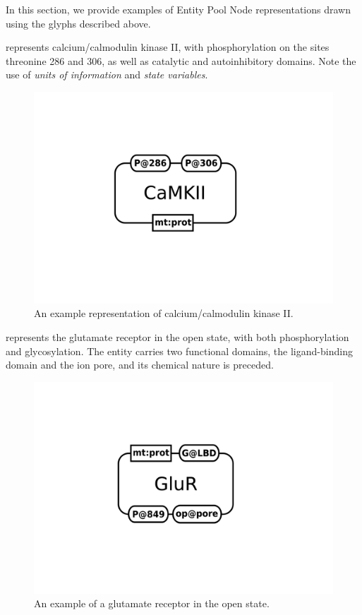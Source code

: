 In this section, we provide examples of Entity Pool Node representations drawn using the \SBGNPDLone glyphs described above.

 represents calcium/calmodulin kinase II, with phosphorylation on the sites threonine 286 and 306, as well as catalytic and autoinhibitory domains.  Note the use of \emph{units of information} and \emph{state variables}.

\begin{figure}[htb]
  \centering
  \includegraphics[scale = 0.3]{examples/macromolecule-CaMKII}
  \caption{An example representation of calcium/calmodulin kinase II.}
  \label{fig:techref:example-camkii}
\end{figure}

 represents the glutamate receptor in the open state, with both phosphorylation and glycosylation. The entity carries two functional domains, the ligand-binding domain and the ion pore, and its chemical nature is preceded.

\begin{figure}[htb]
  \centering
  \includegraphics[scale = 0.3]{examples/macromolecule-GluR}
  \caption{An example of a glutamate receptor in the open state.}
  \label{fig:techref:example-glur}
\end{figure}


